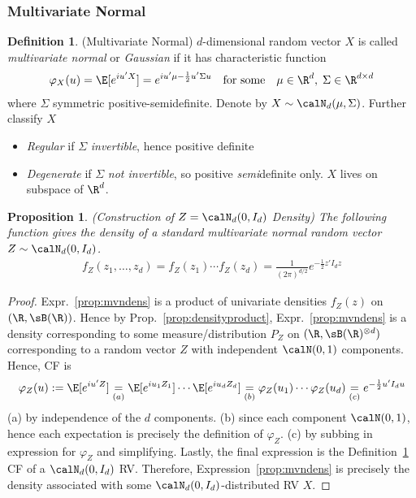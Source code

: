 \documentclass[12pt]{article}
\theoremstyle{plain}
\newtheorem{prop}[thm]{Proposition}
\theoremstyle{definition}
\newtheorem{defn}[thm]{Definition}
\theoremstyle{remark}
\begin{document}
\clearpage
\subsubsection{Multivariate Normal}

\begin{defn}(Multivariate Normal)
\label{defn:mvn}
$d$-dimensional random vector $X$ is called \emph{multivariate normal}
or \emph{Gaussian} if it has characteristic function
\begin{align*}
  \varphi_X(u)
  = \E[e^{iu'X}]
  = e^{iu'\mu-\frac{1}{2}u'\Sigma u}
  \quad\text{for some}\quad
  \mu\in\R^d,\;\Sigma\in\R^{d\times d}
\end{align*}
where $\Sigma$ symmetric positive-semidefinite.
Denote by $X\sim\calN_d(\mu,\Sigma)$.
Further classify $X$
\begin{itemize}
  \item \emph{Regular} if $\Sigma$ \emph{invertible}, hence
    positive definite
  \item \emph{Degenerate} if $\Sigma$ \emph{not invertible},
    so positive \emph{semi}definite only.
    $X$ lives on subspace of $\R^d$.
\end{itemize}
\end{defn}

\begin{prop}\emph{(Construction of $Z=\calN_d(0,I_d)$ Density)}
The following function gives the density of a standard multivariate
normal random vector $Z\sim \calN_d(0,I_d)$.
\begin{align}
  f_Z(z_1,\ldots,z_d)
  = f_Z(z_1)\cdots f_Z(z_d)
  =
  \frac{1}{(2\pi)^{d/2}}
  e^{-\frac{1}{2}z'I_dz}
  \label{prop:mvndens}
\end{align}
\end{prop}
\begin{proof}
Expr.~\ref{prop:mvndens} is a product of univariate
densities $f_Z(z)$ on $(\R,\sB(\R))$.
Hence by Prop.~\ref{prop:densityproduct},
Expr.~\ref{prop:mvndens} is a density
corresponding to some measure/distribution $P_Z$ on
$(\R,\sB(\R)^{\otimes d})$ corresponding to a random vector $Z$ with
independent $\calN(0,1)$ components.
Hence, CF is
\begin{align*}
  \varphi_Z(u)
  := \E[e^{iu'Z}]
  \underset{(a)}{=}
    \E[e^{iu_1Z_1}]
    \cdots
    \E[e^{iu_dZ_d}]
  \underset{(b)}{=}
  \varphi_Z(u_1)\cdots\varphi_Z(u_d)
  \underset{(c)}{=}
  e^{-\frac{1}{2}u'I_du}
\end{align*}
(a) by independence of the $d$ components.
(b) since each component $\calN(0,1)$, hence each expectation is
precisely the definition of $\varphi_Z$.
(c) by subbing in expression for $\varphi_Z$ and simplifying.
Lastly, the final expression is the Definition~\ref{defn:mvn}
CF of a $\calN_d(0,I_d)$ RV.
Therefore, Expression~\ref{prop:mvndens} is precisely the density
associated with some $\calN_d(0,I_d)$-distributed RV $X$.
\end{proof}
\end{document}
